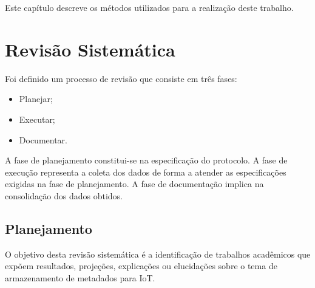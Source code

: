 \newcommand{\texCommand}[1]{\texttt{\textbackslash{#1}}}%

\newcommand{\exemplo}[1]{%
\vspace{\baselineskip}%
\noindent\fbox{\begin{minipage}{\textwidth}#1\end{minipage}}%
\\\vspace{\baselineskip}}%

\newcommand{\exemploVerbatim}[1]{%
\vspace{\baselineskip}%
\noindent\fbox{\begin{minipage}{\textwidth}%
#1\end{minipage}}%
\\\vspace{\baselineskip}}%


Este capítulo descreve os métodos utilizados para a realização deste trabalho.

\section{Revisão Sistemática}

Foi definido um processo de revisão que consiste em três fases:
\begin{itemize}
  \item Planejar;
  \item Executar;
  \item Documentar.
\end{itemize}

A fase de planejamento constitui-se na especificação do protocolo.
A fase de execução representa a coleta dos dados de forma a atender as especificações
exigidas na fase de planejamento.
A fase de documentação implica na consolidação dos dados obtidos.

\subsection{Planejamento}
O objetivo desta revisão sistemática é a identificação de trabalhos acadêmicos
que expõem resultados, projeções, explicações ou elucidações sobre o tema de armazenamento de metadados para \acrlong{IoT}.

